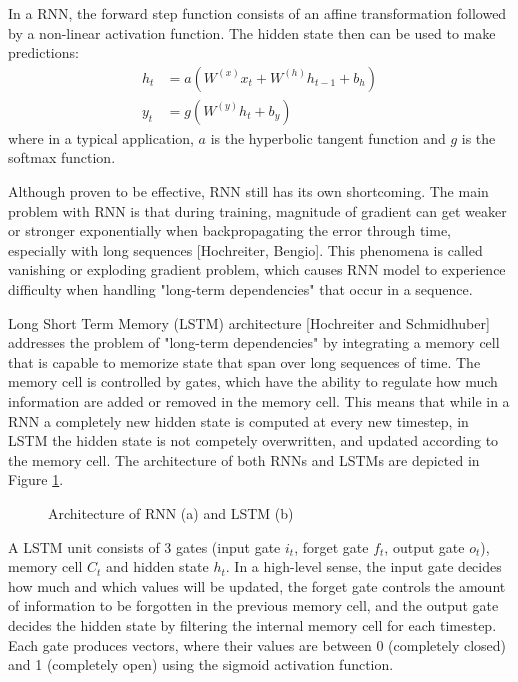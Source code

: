 \documentclass[12pt]{extarticle}
\begin{document}
In a RNN, the forward step function consists of an affine transformation followed by a non-linear activation function. The hidden state then can be used to make predictions:
\begin{align*}
h_{t} &= a(W^{(x)}x_{t} + W^{(h)}h_{t-1} + b_{h})\\
y_{t} &= g(W^{(y)}h_{t} + b_{y}) 
\end{align*}
where in a typical application, $a$ is the hyperbolic tangent function and $g$ is the softmax function.

Although proven to be effective, RNN still has its own shortcoming. The main problem with RNN is that during training, magnitude of gradient can get weaker or stronger exponentially when backpropagating the error through time, especially with long sequences [Hochreiter, Bengio]. This phenomena is called vanishing or exploding gradient problem, which causes RNN model to experience difficulty when handling "long-term dependencies" that occur in a sequence.

Long Short Term Memory (LSTM) architecture [Hochreiter and Schmidhuber] addresses the problem of "long-term dependencies" by integrating a memory cell that is capable to memorize state that span over long sequences of time. The memory cell is controlled by gates, which have the ability to regulate how much information are added or removed in the memory cell. This means that while in a RNN a completely new hidden state is computed at every new timestep, in LSTM the hidden state is not competely overwritten, and updated according to the memory cell. The architecture of both RNNs and LSTMs are depicted in Figure \ref{fig:rnn}.
\begin{figure}[h]
\centering
{}


\caption{Architecture of RNN (a) and LSTM (b)}
\label{fig:rnn}
\end{figure}

A LSTM unit consists of 3 gates (input gate $i_{t}$, forget gate $f_{t}$, output gate $o_{t}$), memory cell $C_{t}$ and hidden state $h_{t}$. In a high-level sense, the input gate decides how much and which values will be updated, the forget gate controls the amount of information to be forgotten in the previous memory cell, and the output gate decides the hidden state by filtering the internal memory cell for each timestep. Each gate produces vectors, where their values are between 0 (completely closed) and 1 (completely open) using the sigmoid activation function. 
\end{document}
